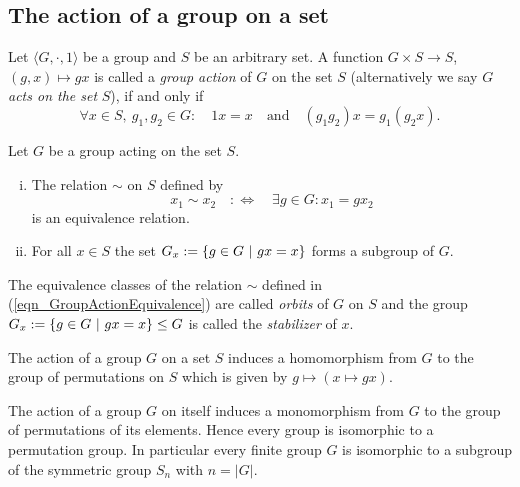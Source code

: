 \subsection{The action of a group on a set}

\begin{definition}
\label{dfn_GroupAction}
Let $\langle G, \cdot, 1 \rangle$ be a group and $S$ be an arbitrary set. A function $G \times S \to S$, $(g, x) \mapsto g x$ is called a \emph{group action} of $G$ on the set $S$ (alternatively we say $G$ \emph{acts on the set} $S$), if and only if
\begin{equation*}
\forall x \in S,\ g_1, g_2 \in G:\quad 1 x = x \quad \text{and} \quad (g_1 g_2) x = g_1 (g_2 x).
\end{equation*}
\end{definition}

\begin{theorem}
Let $G$ be a group acting on the set $S$.
\begin{enumerate}[(i)]
\item The relation $\sim$ on $S$ defined by
\begin{equation}
\label{eqn_GroupActionEquivalence}
x_1 \sim x_2 \quad:\Leftrightarrow\quad \exists g \in G: x_1 = g x_2
\end{equation}
is an equivalence relation.
\item For all $x \in S$ the set $G_x := \{ g \in G \ | \ gx = x \}$ forms a subgroup of $G$.
\end{enumerate}
\end{theorem}

\begin{definition}
\label{dfn_OrbitStabilizer}
The equivalence classes of the relation $\sim$ defined in (\ref{eqn_GroupActionEquivalence}) are called \emph{orbits} of $G$ on $S$ and the group $G_x := \{ g \in G \ | \ gx = x \} \le G$ is called the \emph{stabilizer} of $x$.
\end{definition}

\begin{theorem}
\label{thm_GroupActionHom}
The action of a group $G$ on a set $S$ induces a homomorphism from $G$ to the group of permutations on $S$ which is given by $g \mapsto (x \mapsto gx)$.
\end{theorem}

\begin{corollary}[Cayley]
The action of a group $G$ on itself induces a monomorphism from $G$ to the group of permutations of its elements. Hence every group is isomorphic to a permutation group. In particular every finite group $G$ is isomorphic to a subgroup of the symmetric group $S_n$ with $n = |G|$.
\end{corollary}
